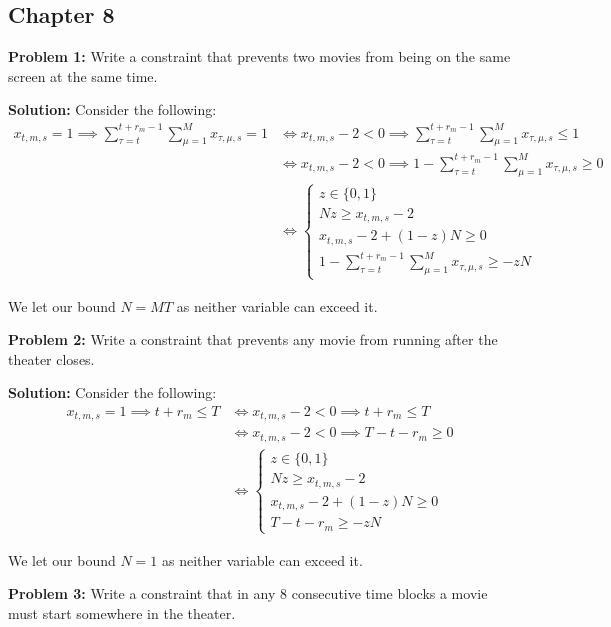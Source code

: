 \documentclass{article}
\begin{document}
\subsection*{Chapter 8}
\noindent\textbf{Problem 1:} Write a constraint that prevents two movies from being on the same screen at the same time.
\bigskip

\noindent\textbf{Solution:} Consider the following:
\begin{align*}
    x_{t,m,s}=1\implies\sum_{\tau=t}^{t+r_m-1}\sum_{\mu=1}^M x_{\tau,\mu,s}=1&\iff x_{t,m,s}-2<0\implies \sum_{\tau=t}^{t+r_m-1}\sum_{\mu=1}^M x_{\tau,\mu,s}\le 1\\
    &\iff x_{t,m,s}-2<0\implies 1-\sum_{\tau=t}^{t+r_m-1}\sum_{\mu=1}^M x_{\tau,\mu,s}\ge 0\\
    &\iff\begin{cases}
        z\in\{0,1\}\\
        Nz\ge x_{t,m,s}-2\\
        x_{t,m,s}-2+(1-z)N\ge 0\\
        1-\sum_{\tau=t}^{t+r_m-1}\sum_{\mu=1}^M x_{\tau,\mu,s}\ge -zN
    \end{cases}
\end{align*}

We let our bound $N=MT$ as neither variable can exceed it.
\bigskip

\noindent\textbf{Problem 2:} Write a constraint that prevents any movie from running after the theater closes.
\bigskip

\noindent\textbf{Solution:} Consider the following:
\begin{align*}
    x_{t,m,s}=1\implies t+r_m\le T&\iff x_{t,m,s}-2<0\implies t+r_m\le T\\
    &\iff x_{t,m,s}-2<0\implies T-t-r_m\ge 0\\
    &\iff\begin{cases}
        z\in\{0,1\}\\
        Nz\ge x_{t,m,s}-2\\
        x_{t,m,s}-2+(1-z)N\ge 0\\
        T-t-r_m\ge -zN
    \end{cases}
\end{align*}

We let our bound $N=1$ as neither variable can exceed it.
\bigskip

\noindent\textbf{Problem 3:} Write a constraint that in any 8 consecutive time blocks a movie must start somewhere in the theater.
\bigskip
\end{document}
